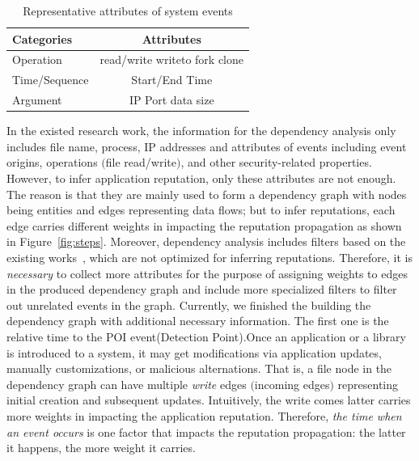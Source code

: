 \begin{table}[]
	\centering
	\caption{Representative attributes of system events}
	\label{table2}
	\begin{tabular}{|l|c|}
		\hline
		Categories    & Attributes                    \\ \hline
		Operation     & read/write writeto fork clone \\ \hline
		Time/Sequence & Start/End Time                \\ \hline
		Argument      & IP Port data size             \\ \hline
	\end{tabular}
\end{table}
In the existed research work, the information for the dependency analysis only includes file name, process, IP addresses and attributes of events including event origins, operations $($file read/write$)$, and other security-related properties. However, to infer application reputation, only these attributes are not enough.
The reason is that they are mainly used to form a dependency graph with nodes being entities and edges representing data flows;
but to infer reputations, each edge carries different weights in impacting the reputation propagation as shown in Figure~\ref{fig:steps}.
Moreover, dependency analysis includes filters based on the existing works~\cite{backtracking,backtracking2}, which are not optimized for inferring reputations.
Therefore, it is \emph{necessary} to collect more attributes for the purpose of assigning weights to edges in the produced dependency graph and include more specialized filters to filter out unrelated events in the graph. Currently, we finished the building the dependency graph with additional necessary information. The first one is the relative time to the POI event(Detection Point).Once an application or a library is introduced to a system, it may get modifications via application updates, manually customizations, or malicious alternations. 
That is, a file node in the dependency graph can have multiple \emph{write} edges $($incoming edges$)$ representing initial creation and subsequent updates.
Intuitively, the write comes latter carries more weights in impacting the application reputation.
Therefore, \emph{the time when an event occurs} is one factor that impacts the reputation propagation: the latter it happens, the more weight it carries.
